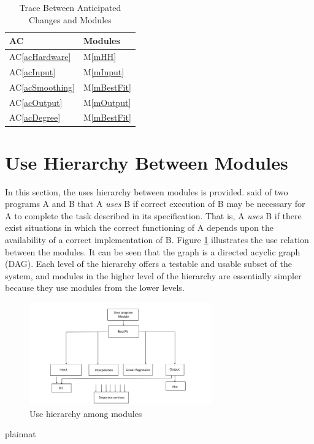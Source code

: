 \documentclass[12pt, titlepage]{article}
\newcommand{\acref}[1]{AC\ref{#1}}
\newcommand{\mref}[1]{M\ref{#1}}
\begin{document}
\begin{table}[H]
\centering
\begin{tabular}{p{} p{}}
\toprule
\textbf{AC} & \textbf{Modules}\\
\midrule
\acref{acHardware} & \mref{mHH}\\
\acref{acInput} & \mref{mInput}\\
\acref{acSmoothing} & \mref{mBestFit}\\
\acref{acOutput} & \mref{mOutput}\\
\acref{acDegree} & \mref{mBestFit}\\
\bottomrule
\end{tabular}
\caption{Trace Between Anticipated Changes and Modules}
\label{TblACT}
\end{table}

\section{Use Hierarchy Between Modules} \label{SecUse}

In this section, the uses hierarchy between modules is
provided. \citet{Parnas1978} said of two programs A and B that A {\em uses} B if
correct execution of B may be necessary for A to complete the task described in
its specification. That is, A {\em uses} B if there exist situations in which
the correct functioning of A depends upon the availability of a correct
implementation of B.  Figure \ref{FigUH} illustrates the use relation between
the modules. It can be seen that the graph is a directed acyclic graph
(DAG). Each level of the hierarchy offers a testable and usable subset of the
system, and modules in the higher level of the hierarchy are essentially simpler
because they use modules from the lower levels.

\begin{figure}[H]
\centering
\includegraphics[width=0.7\textwidth]{UsesHierarchy.png}
\caption{Use hierarchy among modules}
\label{FigUH}
\end{figure}


 {plainnat}

\end{document}
